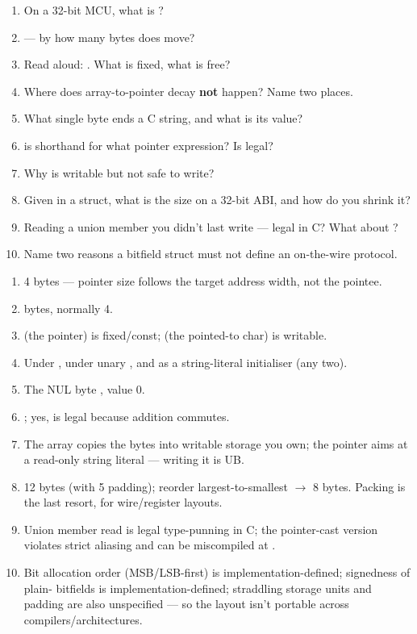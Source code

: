\begin{scorecard}
\begin{enumerate}
\item On a 32-bit MCU, what is ?
\item {} --- by how many bytes does  move?
\item Read aloud: . What is fixed, what is free?
\item Where does array-to-pointer decay \textbf{not} happen? Name two places.
\item What single byte ends a C string, and what is its value?
\item {} is shorthand for what pointer expression? Is
   legal?
\item Why is  writable but  not
  safe to write?
\item Given  in a struct, what is the
  size on a 32-bit ABI, and how do you shrink it?
\item Reading a union member you didn't last write --- legal in C? What about
  ?
\item Name two reasons a bitfield struct must not define an on-the-wire
  protocol.
\end{enumerate}
\end{scorecard}

\begin{answerkey}
\begin{enumerate}
\item 4 bytes --- pointer size follows the target address width, not the
  pointee.
\item {} bytes, normally 4.
\item {} (the pointer) is fixed/const;  (the pointed-to char)
  is writable.
\item Under , under unary \code{\&}, and as a 
  string-literal initialiser (any two).
\item The NUL byte , value 0.
\item {}; yes,  is legal because addition
  commutes.
\item The array copies the bytes into writable storage you own; the pointer
  aims at a read-only string literal --- writing it is UB.
\item 12 bytes (with 5 padding); reorder largest-to-smallest $\rightarrow$
  8 bytes. Packing is the last resort, for wire/register layouts.
\item Union member read is legal type-punning in C; the pointer-cast version
  violates strict aliasing and can be miscompiled at .
\item Bit allocation order (MSB/LSB-first) is implementation-defined;
  signedness of plain- bitfields is implementation-defined;
  straddling storage units and padding are also unspecified --- so the layout
  isn't portable across compilers/architectures.
\end{enumerate}
\end{answerkey}

